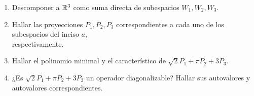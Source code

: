 \item \begin{enumerate}
        \item Descomponer a $\mathbb{R}^3$ como suma directa de subespacios $W_1,W_2,W_3$.
            \begin{mdframed}[style=s]
                
            \end{mdframed}
        \item Hallar las proyecciones $P_1,P_2,P_3$ correspondientes a cada uno de los subespacios del inciso $a$,\\respectivamente.
            \begin{mdframed}[style=s]
                
            \end{mdframed}
        \item Hallar el polinomio minimal y el característico de $\sqrt{2}P_1+\pi P_2+3P_3$.
            \begin{mdframed}[style=s]
                
            \end{mdframed}
        \item ¿Es $\sqrt{2}P_1+\pi P_2+3P_3$ un operador diagonalizable? Hallar sus autovalores y autovalores correspondientes.
            \begin{mdframed}[style=s]
                
            \end{mdframed}
    \end{enumerate}